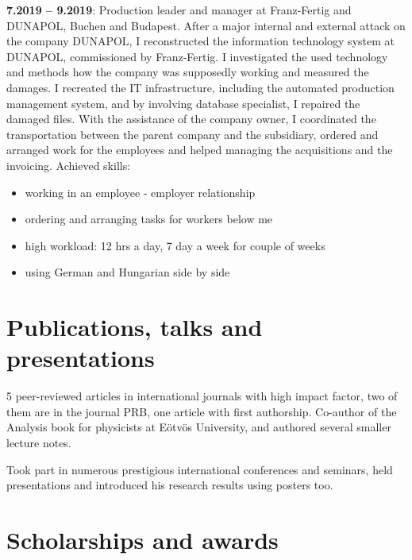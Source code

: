 \documentclass[11pt,a4paper,sans]{moderncv}        %
\begin{document}
\textbf{7.2019 -- 9.2019}: Production leader and manager at Franz-Fertig and DUNAPOL, Buchen and Budapest. After a major internal and external attack on the company DUNAPOL, I reconstructed the information technology system at DUNAPOL, commissioned by Franz-Fertig. I investigated the used technology and methods how the company was supposedly working and measured the damages. I recreated the IT infrastructure, including the automated production management system, and by involving database specialist, I repaired the damaged files. With the assistance of the company owner, I coordinated the transportation between the parent company and the subsidiary, ordered and arranged work for the employees and helped managing the acquisitions and the invoicing. Achieved skills:
\begin{itemize}
\item working in an employee - employer relationship
\item ordering and arranging tasks for workers below me
\item high workload: 12 hrs a day, 7 day a week for couple of weeks
\item using German and Hungarian side by side
\end{itemize}

\section{Publications, talks and presentations}
5 peer-reviewed articles in international journals with high impact factor, two of them are in the journal PRB, one article with first authorship. Co-author of the Analysis book for physicists at Eötvös University, and authored several smaller lecture notes.

Took part in numerous prestigious international conferences and seminars, held presentations and introduced his research results using posters too. 

\section{Scholarships and awards}
\end{document}
